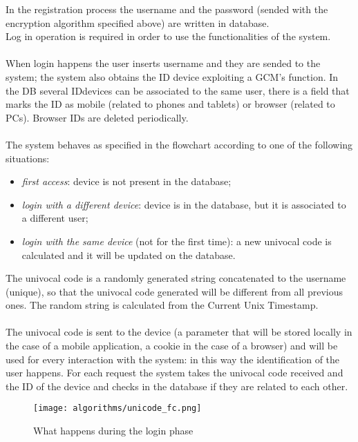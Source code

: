 In the registration process the username and the password (sended with the encryption algorithm specified above) are written in database.\\
Log in operation is required in order to use the functionalities of the system.
\\\\
When login happens the user inserts username and they are sended to the system; the system also obtains the ID device exploiting a GCM's function. In the DB several IDdevices can be associated to the same user, there is a field that marks the ID as mobile (related to phones and tablets) or browser (related to PCs). Browser IDs are deleted periodically. 
\\\\
The system behaves as specified in the flowchart according to one of the following situations:
\begin{itemize}
\item \textit{first access}: device is not present in the database;
\item \textit{login with a different device}: device is in the database, but it is associated to a different user;
\item \textit{login with the same device} (not for the first time): a new univocal code is calculated and it will be updated on the database.
\end{itemize}
The univocal code is a randomly generated string concatenated to the username (unique), so that the univocal code generated will be different from all previous ones. The random string is calculated from the Current Unix Timestamp.
\\\\
The univocal code is sent to the device (a parameter that will be stored locally in the case of a mobile application, a cookie in the case of a browser) and will be used for every interaction with the system: in this way the identification of the user happens. For each request the system takes the univocal code received and the ID of the device and checks in the database if they are related to each other.
\\
\begin{figure}
	\texttt{[image: algorithms/unicode\_fc.png]}
	\centering
	\caption{What happens during the login phase}
\end{figure}
